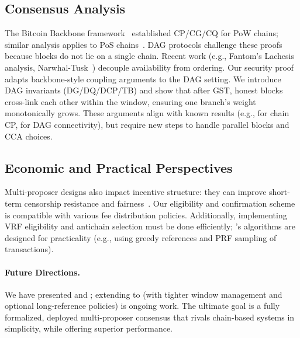 \subsection{Consensus Analysis}
The Bitcoin Backbone framework~\cite{EC:GarKiaLeo15} established CP/CG/CQ for PoW chains; similar analysis applies to PoS chains~\cite{EC:PasSeeShe17}. DAG protocols challenge these proofs because blocks do not lie on a single chain. Recent work (e.g., Fantom's Lachesis analysis, Narwhal-Tusk~\cite{NarwhalTusk}) decouple availability from ordering. Our security proof adapts backbone-style coupling arguments to the DAG setting. We introduce DAG invariants (DG/DQ/DCP/TB) and show that after GST, honest blocks cross-link each other within the window, ensuring one branch's weight monotonically grows. These arguments align with known results (e.g., \cite{EC:GarKiaLeo15} for chain CP, \cite{AFT:SWZ21} for DAG connectivity), but require new steps to handle parallel blocks and CCA choices.

\subsection{Economic and Practical Perspectives}
Multi-proposer designs also impact incentive structure: they can improve short-term censorship resistance and fairness~\cite{FOCIL, multiFee}. Our eligibility and confirmation scheme is compatible with various fee distribution policies. Additionally, implementing VRF eligibility and antichain selection must be done efficiently; \ProjBase's algorithms are designed for practicality (e.g., using greedy references and PRF sampling of transactions).

\paragraph{Future Directions.} We have presented \ProjIdeal and \ProjBase; extending to \ProjFull (with tighter window management and optional long-reference policies) is ongoing work. The ultimate goal is a fully formalized, deployed multi-proposer consensus that rivals chain-based systems in simplicity, while offering superior performance.




